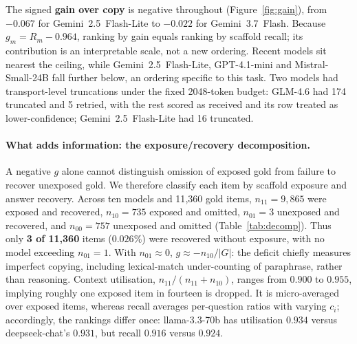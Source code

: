 \documentclass[10pt,twocolumn]{article}
\begin{document}
The signed \textbf{gain over copy} is negative throughout (Figure~\ref{fig:gain}), from $-0.067$ for Gemini~2.5~Flash-Lite to $-0.022$ for Gemini~3.7~Flash. Because $g_m=R_m-0.964$, ranking by gain equals ranking by scaffold recall; its contribution is an interpretable scale, not a new ordering. Recent models sit nearest the ceiling, while Gemini~2.5~Flash-Lite, GPT-4.1-mini and Mistral-Small-24B fall further below, an ordering specific to this task. Two models had transport-level truncations under the fixed 2048-token budget: GLM-4.6 had 174 truncated and 5 retried, with the rest scored as received and its row treated as lower-confidence; Gemini~2.5~Flash-Lite had 16 truncated.

\paragraph{What adds information: the exposure/recovery decomposition.} A negative $g$ alone cannot distinguish omission of exposed gold from failure to recover unexposed gold. We therefore classify each item by scaffold exposure and answer recovery. Across ten models and 11{,}360 gold items, $n_{11}=9{,}865$ were exposed and recovered, $n_{10}=735$ exposed and omitted, $n_{01}=3$ unexposed and recovered, and $n_{00}=757$ unexposed and omitted (Table~\ref{tab:decomp}). Thus only \textbf{3 of 11{,}360} items ($0.026\%$) were recovered without exposure, with no model exceeding $n_{01}=1$. With $n_{01}\approx0$, $g\approx-n_{10}/|G|$: the deficit chiefly measures imperfect copying, including lexical-match under-counting of paraphrase, rather than reasoning. Context utilisation, $n_{11}/(n_{11}+n_{10})$, ranges from $0.900$ to $0.955$, implying roughly one exposed item in fourteen is dropped. It is micro-averaged over exposed items, whereas recall averages per-question ratios with varying $c_i$; accordingly, the rankings differ once: llama-3.3-70b has utilisation $0.934$ versus deepseek-chat's $0.931$, but recall $0.916$ versus $0.924$.
\end{document}
